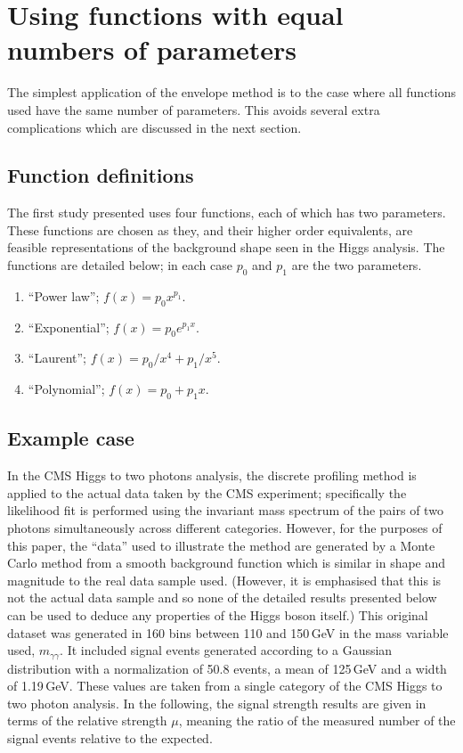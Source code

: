 \section{Using functions with equal numbers of parameters} %
\label{sec:functions}

The simplest application of the envelope method is to the case where all
functions used have the same number of parameters. This avoids several extra
complications which are discussed in the next section.

\subsection{Function definitions}
\label{sec:functions:function}

The first study presented uses four functions, each of which has two parameters.
These functions are chosen as they, and their higher order equivalents,
are feasible representations of the background shape seen in the Higgs
analysis. The functions are detailed below; in each case $p_0$ and $p_1$ are
the two parameters.
\begin{enumerate}
\item
``Power law''; $f(x) = p_0 x^{p_1}$.
\item
``Exponential''; $f(x) = p_0 e^{p_1x}$.
\item
``Laurent''; $f(x) = p_0/x^4 + p_1/x^5$.
\item
``Polynomial''; $f(x) = p_0 + p_1 x$.
\end{enumerate}

\subsection{Example case}
\label{sec:functions:example}

In the CMS Higgs to two photons analysis, the discrete profiling method is applied to
the actual data taken by the CMS experiment; specifically the likelihood fit
is performed using the invariant mass spectrum of the pairs of two photons simultaneously 
across different categories. 
However, for the purposes of this
paper, the ``data'' used to illustrate the method are generated by a Monte Carlo
method from a smooth background
function which is similar in shape and magnitude to the
real data sample used. (However, it is emphasised that this is not the 
actual data sample and so 
none of the detailed results presented below can be used to deduce any
properties of the Higgs boson itself.)
This original dataset was generated in 160 bins between 110 and 150\,GeV in
the mass variable used, $m_{\gamma\gamma}$.
It included signal events
generated according to a Gaussian distribution with a normalization of 50.8 events, a mean of 125\,GeV and a 
width of 1.19\,GeV. These values are taken from a single category of the CMS Higgs to two photon analysis.
In the following, the signal strength results are given in
terms of the relative strength $\mu$, 
meaning the ratio of the measured number of the signal events relative
to the expected. 

